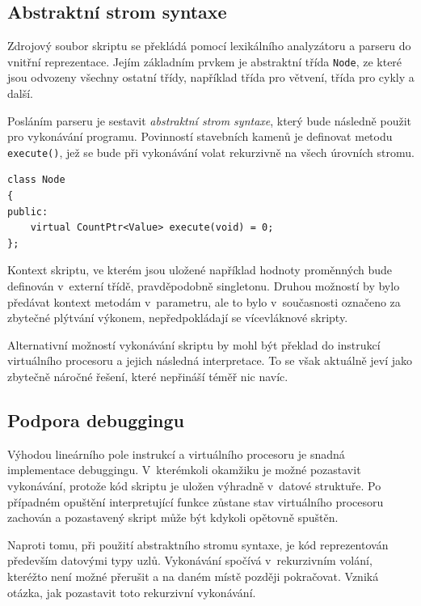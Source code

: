 \documentclass[11pt,twoside,a4paper]{book}
\begin{document}
\subsection{Abstraktní strom syntaxe}
\label{abstraktni_strom_syntaxe}

Zdrojový soubor skriptu se překládá pomocí lexikálního analyzátoru a parseru do vnitřní reprezentace. Jejím základním prvkem je abstraktní třída \texttt{Node}, ze které jsou odvozeny všechny ostatní třídy, například třída pro větvení, třída pro cykly a další.

Posláním parseru je sestavit \textit{abstraktní strom syntaxe}, který bude následně použit pro vykonávání programu. Povinností stavebních kamenů je definovat metodu \texttt{execute()}, jež se bude při vykonávání volat rekurzivně na všech úrovních stromu.

\begin{verbatim}
class Node
{
public:
    virtual CountPtr<Value> execute(void) = 0;
};
\end{verbatim}

Kontext skriptu, ve kterém jsou uložené například hodnoty proměnných bude definován v~externí třídě, pravděpodobně singletonu. Druhou možností by bylo předávat kontext metodám v~parametru, ale to bylo v~současnosti označeno za zbytečné plýtvání výkonem, nepředpokládají se vícevláknové skripty.

Alternativní možností vykonávání skriptu by mohl být překlad do instrukcí virtuálního procesoru a jejich následná interpretace. To se však aktuálně jeví jako zbytečně náročné řešení, které nepřináší téměř nic navíc.


\subsection{Podpora debuggingu}
\label{podpora_debuggingu}

Výhodou lineárního pole instrukcí a virtuálního procesoru je snadná implementace de\-bug\-gin\-gu. V~kterémkoli okamžiku je možné pozastavit vykonávání, protože kód skriptu je uložen výhradně v~datové struktuře. Po případném opuštění interpretující funkce zůstane stav vir\-tu\-ál\-ní\-ho procesoru zachován a pozastavený skript může být kdykoli opětovně spuštěn.

Naproti tomu, při použití abstraktního stromu syntaxe, je kód reprezentován především datovými typy uzlů. Vykonávání spočívá v~rekurzivním volání, kteréžto není možné přerušit a na daném místě později pokračovat. Vzniká otázka, jak pozastavit toto rekurzivní vykonávání.
\end{document}
